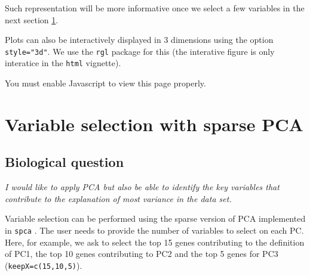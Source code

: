 \documentclass[]{book}
\newenvironment{Shaded}{\begin{snugshade}}{\end{snugshade}}
\newcommand{\DataTypeTok}[1]{\textcolor[rgb]{0.13,0.29,0.53}{#1}}
\newcommand{\KeywordTok}[1]{\textcolor[rgb]{0.13,0.29,0.53}{\textbf{#1}}}
\newcommand{\NormalTok}[1]{#1}
\newcommand{\OperatorTok}[1]{\textcolor[rgb]{0.81,0.36,0.00}{\textbf{#1}}}
\newcommand{\OtherTok}[1]{\textcolor[rgb]{0.56,0.35,0.01}{#1}}
\newcommand{\StringTok}[1]{\textcolor[rgb]{0.31,0.60,0.02}{#1}}
\begin{document}
Such representation will be more informative once we select a few variables in the next section \ref{sPCA}.

Plots can also be interactively displayed in 3 dimensions using the option \texttt{style="3d"}. We use the \texttt{rgl} package for this (the interative figure is only interatice in the \texttt{html} vignette).

\begin{Shaded}
\end{Shaded}

\hypertarget{_03_pca_liver_plotIndivdiv}{}

You must enable Javascript to view this page properly.

\hypertarget{sPCA}{%
\section{Variable selection with sparse PCA}\label{sPCA}}

\hypertarget{biological-question-1}{%
\subsection{Biological question}\label{biological-question-1}}

{
\emph{I would like to apply PCA but also be able to identify the key variables that contribute to the explanation of most variance in the data set.}
}

Variable selection can be performed using the sparse version of PCA implemented in \texttt{spca} \citep{She08}. The user needs to provide the number of variables to select on each PC. Here, for example, we ask to select the top 15 genes contributing to the definition of PC1, the top 10 genes contributing to PC2 and the top 5 genes for PC3 (\texttt{keepX=c(15,10,5)}).
\end{document}
